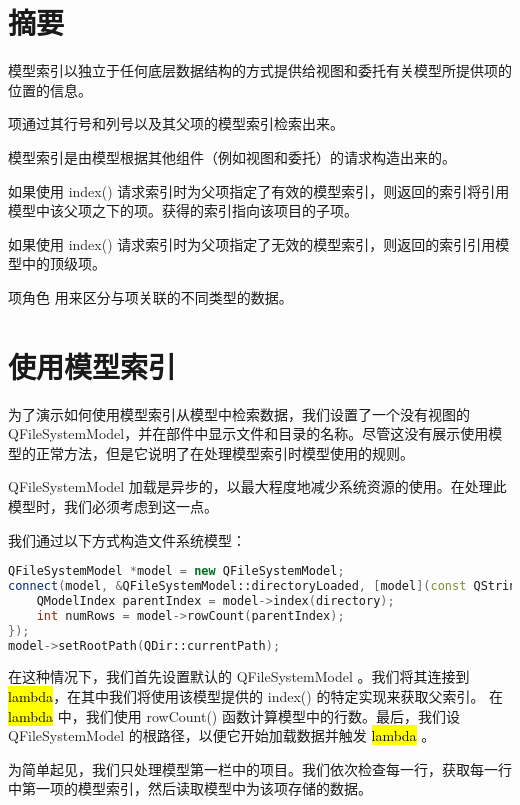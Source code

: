 \section{摘要}

\begin{compactitem}[\arr]
\item 模型索引以独立于任何底层数据结构的方式提供给视图和委托有关模型所提供项的位置的信息。
\item 项通过其行号和列号以及其父项的模型索引检索出来。
\item 模型索引是由模型根据其他组件（例如视图和委托）的请求构造出来的。
\item 如果使用 index() 请求索引时为父项指定了有效的模型索引，则返回的索引将引用模型中该父项之下的项。获得的索引指向该项目的子项。
\item 如果使用 index() 请求索引时为父项指定了无效的模型索引，则返回的索引引用模型中的顶级项。
\item 项角色 用来区分与项关联的不同类型的数据。
\end{compactitem}

\section{使用模型索引}

为了演示如何使用模型索引从模型中检索数据，我们设置了一个没有视图的 QFileSystemModel，并在部件中显示文件和目录的名称。尽管这没有展示使用模型的正常方法，但是它说明了在处理模型索引时模型使用的规则。

QFileSystemModel 加载是异步的，以最大程度地减少系统资源的使用。在处理此模型时，我们必须考虑到这一点。

我们通过以下方式构造文件系统模型：

\begin{lstlisting}[language=C++]
QFileSystemModel *model = new QFileSystemModel;
connect(model, &QFileSystemModel::directoryLoaded, [model](const QString &directory) {
    QModelIndex parentIndex = model->index(directory);
    int numRows = model->rowCount(parentIndex);
});
model->setRootPath(QDir::currentPath);
\end{lstlisting}

在这种情况下，我们首先设置默认的 QFileSystemModel 。我们将其连接到 \hl{lambda}，在其中我们将使用该模型提供的 index() 的特定实现来获取父索引。 在 \hl{lambda} 中，我们使用 rowCount() 函数计算模型中的行数。最后，我们设 QFileSystemModel 的根路径，以便它开始加载数据并触发 \hl{lambda} 。

为简单起见，我们只处理模型第一栏中的项目。我们依次检查每一行，获取每一行中第一项的模型索引，然后读取模型中为该项存储的数据。

